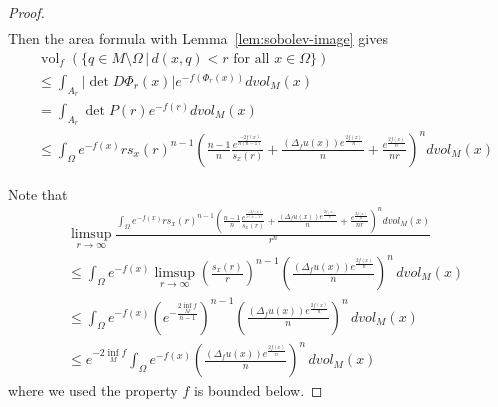 \documentclass[psamsfonts]{amsart}
\theoremstyle{definition}
\theoremstyle{remark}
\numberwithin{equation}{section}
\begin{document}
\begin{proof}
{\begin{align*}
\end{align*}
}
Then the area formula with Lemma~\ref{lem:sobolev-image} gives
\begin{align*}
    &\operatorname{vol}_f(\{q \in M \setminus \Omega\, |\, d(x,q) <r \text{ for all } x \in \Omega \})\\
    & \leq \int_{A_r} |\operatorname{det} D\Phi_r(x)|e^{-f(\Phi_r(x))}dvol_M(x)\\
    & = \int_{A_r} \operatorname{det} P(r) e^{-f(r)} dvol_M(x)\\
    & \leq \int_{\Omega}  e^{-f(x)}rs_x(r)^{n-1} \left( \frac{n-1}{n} \frac{e^{\frac{-2f(x)}{n(n-1)}}}{s_x(r)} + \frac{(\Delta_f u(x)) e^{\frac{2f(x)}{n}}}{n} + \frac{e^{\frac{2f(x)}{n}}}{nr}\right)^n dvol_M(x)
\end{align*}

Note that
\begin{align*}
    &\limsup_{r\to \infty}\frac{\int_{\Omega} e^{-f(x)} rs_x(r)^{n-1} \left( \frac{n-1}{n} \frac{e^{\frac{-2f(x)}{n(n-1)}}}{s_x(r)} + \frac{(\Delta_f u(x)) e^{\frac{2f(x)}{n}}}{n} + \frac{e^{\frac{2f(x)}{n}}}{nr}\right)^n dvol_M(x)}{r^n}\\
    & \leq \int_\Omega e^{-f(x)}\limsup_{r \to \infty} \left( \frac{s_x(r)}{r}\right)^{n-1}\left(\frac{(\Delta_f u(x)) e^{\frac{2f(x)}{n}}}{n}\right)^n\, dvol_M(x)\\
    & \leq \int_\Omega e^{-f(x)} \left(e^{-\frac{2\inf_M f}{n-1}}\right)^{n-1}\left(\frac{(\Delta_f u(x)) e^{\frac{2f(x)}{n}}}{n}\right)^n\, dvol_M(x)\\
    & \leq e^{-2\inf_M f}\int_\Omega e^{-f(x)}\left(\frac{(\Delta_f u(x)) e^{\frac{2f(x)}{n}}}{n}\right)^n\, dvol_M(x)
\end{align*}
where we used the property $f$ is bounded below.


\end{proof}
\end{document}
